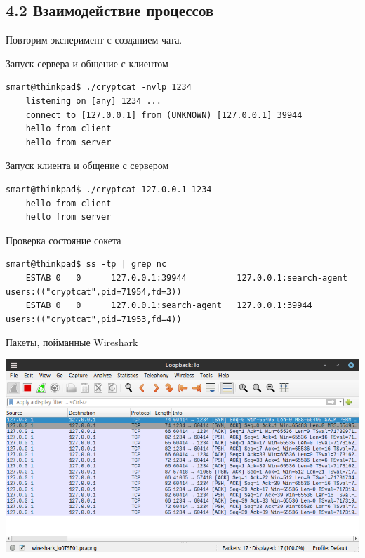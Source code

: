 \subsection*{4.2 Взаимодействие процессов}

Повторим эксперимент с созданием чата.

Запуск сервера и общение с клиентом
\begin{Verbatim}[frame=single,breaklines=true,breakanywhere=true]
    smart@thinkpad$ ./cryptcat -nvlp 1234
    listening on [any] 1234 ...
    connect to [127.0.0.1] from (UNKNOWN) [127.0.0.1] 39944
    hello from client
    hello from server
\end{Verbatim}

Запуск клиента и общение с сервером
\begin{Verbatim}[frame=single,breaklines=true,breakanywhere=true]
    smart@thinkpad$ ./cryptcat 127.0.0.1 1234
    hello from client
    hello from server
\end{Verbatim}

Проверка состояние сокета
\begin{Verbatim}[frame=single,breaklines=true,breakanywhere=true]
    smart@thinkpad$ ss -tp | grep nc
    ESTAB 0   0      127.0.0.1:39944          127.0.0.1:search-agent users:(("cryptcat",pid=71954,fd=3))
    ESTAB 0   0      127.0.0.1:search-agent   127.0.0.1:39944        users:(("cryptcat",pid=71953,fd=4))
\end{Verbatim}

\newpage

Пакеты, пойманные Wireshark
\begin{center}
    \includegraphics[scale=0.55]{res/7.wireshark-cryptcat-chat.png}
\end{center}

